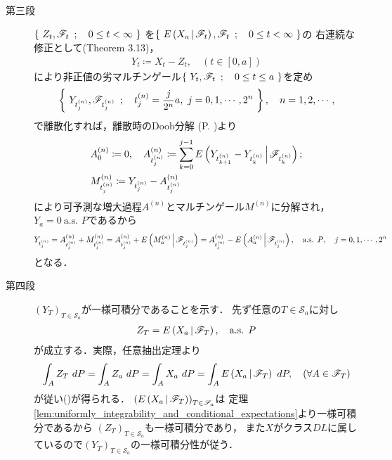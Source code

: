 \begin{prf}
\begin{description}
			\item[第三段]
				$\left\{\ Z_t,\mathscr{F}_t\ \, ; \quad 0 \leq t < \infty\ \right\}$
				を$\left\{\ E\left( X_a \, \middle|\, \mathscr{F}_t \right),\mathscr{F}_t\ \, ; \quad 0 \leq t < \infty\ \right\}$の
				右連続な修正として(Theorem 3.13)，
				\begin{align}
					Y_t \coloneqq X_t - Z_t,
					\quad (t \in [0,a])
				\end{align}
				により非正値の劣マルチンゲール$\left\{\ Y_t,\mathscr{F}_t\ \, ; \quad 0 \leq t \leq a\ \right\}$を定め
				\begin{align}
					\left\{\ Y_{t^{(n)}_j},\mathscr{F}_{t^{(n)}_j}\ \, ; \quad t^{(n)}_j = \frac{j}{2^n}a,\ j=0,1,\cdots,2^n\ \right\},
					\quad n=1,2,\cdots,
				\end{align}
				で離散化すれば，離散時のDoob分解 (P. \pageref{lem:Doob_decomposition})より
				\begin{align}
					&A^{(n)}_0 \coloneqq 0,
					\quad A^{(n)}_{t^{(n)}_j} \coloneqq \sum_{k=0}^{j-1} E\left( Y_{t^{(n)}_{k+1}} - Y_{t^{(n)}_k} \, \middle|\, \mathscr{F}_{t^{(n)}_k} \right); \\
					&M^{(n)}_{t^{(n)}_j} \coloneqq Y_{t^{(n)}_j} - A^{(n)}_{t^{(n)}_j}
				\end{align}
				により可予測な増大過程$A^{(n)}$とマルチンゲール$M^{(n)}$に分解され，
				$Y_a = 0\ \mbox{a.s. $P$}$であるから
				\begin{align}
					Y_{t^{(n)}_j} = A^{(n)}_{t^{(n)}_j} +  M^{(n)}_{t^{(n)}_j}
					= A^{(n)}_{t^{(n)}_j} + E\left( M^{(n)}_a \, \middle|\, \mathscr{F}_{t^{(n)}_j} \right)
					= A^{(n)}_{t^{(n)}_j} - E\left( A^{(n)}_a \, \middle|\, \mathscr{F}_{t^{(n)}_j} \right),
					\quad \mbox{a.s. $P$},
					\quad j=0,1,\cdots,2^n
				\end{align}
				となる．

			\item[第四段]
				$(Y_T)_{T \in \mathscr{S}_a}$が一様可積分であることを示す．
				先ず任意の$T \in \mathscr{S}_a$に対し
				\begin{align}
					Z_T = E\left( X_a \, \middle|\, \mathscr{F}_T \right),\quad \mbox{a.s. $P$}
					\label{eq:chapter_1_theorem_4_10_2}
				\end{align}
				が成立する．実際，任意抽出定理より
				\begin{align}
					\int_A Z_T\ dP = \int_A Z_a\ dP
					= \int_A X_a\ dP
					= \int_A E\left( X_a \, \middle|\, \mathscr{F}_T \right)\ dP,
					\quad (\forall A \in \mathscr{F}_T)
				\end{align}
				が従い()が得られる．
				$\left(E\left( X_a \, \middle|\, \mathscr{F}_T \right)\right)_{T \in \mathscr{S}_a}$は
				定理\ref{lem:uniformly_integrability_and_conditional_expectations}より一様可積分であるから
				$\left(Z_T\right)_{T \in \mathscr{S}_a}$も一様可積分であり，
				また$X$がクラス$DL$に属しているので$(Y_T)_{T \in \mathscr{S}_a}$の一様可積分性が従う．
				

\end{description}
\end{prf}
